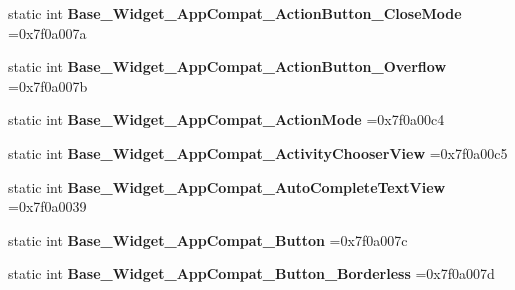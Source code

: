 \begin{DoxyCompactItemize}
\mbox{\label{classandroid_1_1support_1_1graphics_1_1drawable_1_1R_1_1style_aa4c97b8d337cd7d85aab8098e2e55fb3}} 
static int {\bfseries Base\+\_\+\+Widget\+\_\+\+App\+Compat\+\_\+\+Action\+Button\+\_\+\+Close\+Mode} =0x7f0a007a
\item 
\mbox{\label{classandroid_1_1support_1_1graphics_1_1drawable_1_1R_1_1style_a959bd76ea58d303527427f17dc3a3d01}} 
static int {\bfseries Base\+\_\+\+Widget\+\_\+\+App\+Compat\+\_\+\+Action\+Button\+\_\+\+Overflow} =0x7f0a007b
\item 
\mbox{\label{classandroid_1_1support_1_1graphics_1_1drawable_1_1R_1_1style_a53c67a7bf0e120bd6e49331b7d8b50b5}} 
static int {\bfseries Base\+\_\+\+Widget\+\_\+\+App\+Compat\+\_\+\+Action\+Mode} =0x7f0a00c4
\item 
\mbox{\label{classandroid_1_1support_1_1graphics_1_1drawable_1_1R_1_1style_aa20bc796e4f45c7110af9f3aeadb241d}} 
static int {\bfseries Base\+\_\+\+Widget\+\_\+\+App\+Compat\+\_\+\+Activity\+Chooser\+View} =0x7f0a00c5
\item 
\mbox{\label{classandroid_1_1support_1_1graphics_1_1drawable_1_1R_1_1style_ad3e2004747056f3c92d5d9b6a35bd996}} 
static int {\bfseries Base\+\_\+\+Widget\+\_\+\+App\+Compat\+\_\+\+Auto\+Complete\+Text\+View} =0x7f0a0039
\item 
\mbox{\label{classandroid_1_1support_1_1graphics_1_1drawable_1_1R_1_1style_a2b587a0a32272186b7be2aae11ba815a}} 
static int {\bfseries Base\+\_\+\+Widget\+\_\+\+App\+Compat\+\_\+\+Button} =0x7f0a007c
\item 
\mbox{\label{classandroid_1_1support_1_1graphics_1_1drawable_1_1R_1_1style_ad326025b8c04566274489e572e11a610}} 
static int {\bfseries Base\+\_\+\+Widget\+\_\+\+App\+Compat\+\_\+\+Button\+\_\+\+Borderless} =0x7f0a007d
\item 
\mbox{\label{classandroid_1_1support_1_1graphics_1_1drawable_1_1R_1_1style_a7da5d227731a9fd430f2962dce5d3c0b}} 

\end{DoxyCompactItemize}
